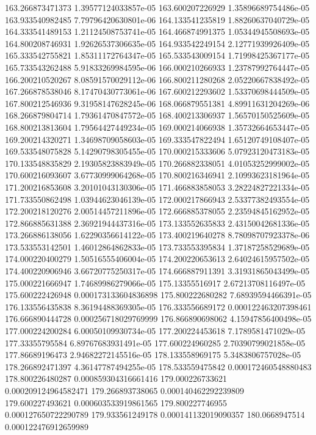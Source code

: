 {163.266873471373 1.39577124033857e-05
163.600207226929 1.35896689754486e-05
163.933540982485 7.79796420630801e-06
164.133541235819 1.88260637040729e-05
164.333541489153 1.21124508753741e-05
164.466874991375 1.05344945508693e-05
164.800208746931 1.92626537306635e-05
164.933542249154 2.12771939926409e-05
165.333542755821 1.85311172764347e-05
165.533543009154 1.71998425367177e-05
165.733543262488 5.91833269984595e-06
166.000210266933 1.23787992764447e-05
166.200210520267 8.08591570029112e-06
166.800211280268 2.05220667838492e-05
167.266878538046 8.17470430773061e-06
167.600212293602 1.53370698444509e-05
167.800212546936 9.31958147628245e-06
168.066879551381 4.89911631204269e-06
168.266879804714 1.79361470847572e-05
168.400213306937 1.56570150525609e-05
168.800213813604 1.79564427449234e-05
169.000214066938 1.35732664653447e-05
169.200214320271 1.34698709058603e-05
169.333547822494 1.65120749108407e-05
169.533548075828 5.14290798305455e-05
170.000215333606 5.07923120473183e-05
170.133548835829 2.19305823883949e-05
170.266882338051 4.01053252999002e-05
170.600216093607 3.67730999064268e-05
170.800216346941 2.10993623181964e-05
171.200216853608 3.20101043130306e-05
171.466883858053 3.28224827221334e-05
171.733550862498 1.03944623046139e-05
172.000217866943 2.53377382493554e-05
172.200218120276 2.00514457211896e-05
172.666885378055 2.23594845162952e-05
172.866885631388 2.36921944437316e-05
173.133552635833 2.43150042681336e-05
173.266886138056 1.62290356614122e-05
173.400219640278 8.78098707923378e-06
173.533553142501 1.46012864862833e-05
173.733553395834 1.37187258529689e-05
174.000220400279 1.50516555406004e-05
174.200220653613 2.64024615957502e-05
174.400220906946 3.66720775250317e-05
174.666887911391 3.31931865043499e-05
175.000221666947 1.74689986279066e-05
175.13355516917 2.67213708116497e-05
175.600222426948 0.000173133604836898
175.800222680282 7.68939594466391e-05
176.133556435838 8.36194488369305e-05
176.333556689172 0.000122463207398461
176.666890444728 0.000256718029769999
176.866890698062 4.15947856400498e-05
177.000224200284 6.00050109930734e-05
177.200224453618 7.1789581471029e-05
177.33355795584 6.89767683931491e-05
177.600224960285 2.70390799021858e-05
177.86689196473 2.94682272145516e-05
178.133558969175 5.3483806757028e-05
178.266892471397 4.36147787494255e-05
178.533559475842 0.000172460548880483
178.800226480287 0.000859304316661416
179.000226733621 0.000209124964582471
179.266893738065 0.000140462292239809
179.600227493621 0.000603533919861565
179.800227746955 0.000127650722290789
179.933561249178 0.000141132019090357
180.0668947514 0.000122476912659989
}
